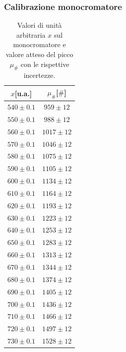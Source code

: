 \subsubsection{Calibrazione monocromatore}
\begin{table}[H]
    \centering
    \begin{tabular}{|c|c|}
        \hline
        
        \textbf{$x$[u.a.]} & \textbf{$\mu_{\#}$[$\#$]}  \\ \hline \hline
        $ 540 \pm 0.1 $  &  $ 959  \pm  12 $  \\ \hline        
        $ 550 \pm 0.1 $  &  $ 988  \pm  12 $  \\ \hline
        $ 560 \pm 0.1 $  &  $ 1017  \pm  12 $   \\ \hline
        $ 570 \pm 0.1 $  &  $ 1046  \pm  12 $  \\ \hline
        $ 580 \pm 0.1 $  &  $ 1075  \pm  12 $   \\ \hline
        $ 590 \pm 0.1 $  &  $ 1105  \pm  12 $  \\ \hline
        $ 600 \pm 0.1 $  &  $ 1134  \pm  12 $ \\ \hline
        $ 610 \pm 0.1 $  &  $ 1164  \pm  12 $  \\ \hline
        $ 620 \pm 0.1 $  &  $ 1193  \pm  12 $ \\ \hline
        $ 630 \pm 0.1 $  &  $ 1223  \pm  12 $  \\ \hline
        $ 640 \pm 0.1 $  &  $ 1253  \pm  12 $  \\ \hline        
        $ 650 \pm 0.1 $  &  $ 1283  \pm  12 $  \\ \hline
        $ 660 \pm 0.1 $  &  $ 1313  \pm  12 $   \\ \hline
        $ 670 \pm 0.1 $  &  $ 1344  \pm  12 $  \\ \hline
        $ 680 \pm 0.1 $  &  $ 1374  \pm  12 $   \\ \hline
        $ 690 \pm 0.1 $  &  $ 1405  \pm  12 $  \\ \hline
        $ 700 \pm 0.1 $  &  $ 1436  \pm  12 $ \\ \hline
        $ 710 \pm 0.1 $  &  $ 1466  \pm  12 $  \\ \hline
        $ 720 \pm 0.1 $  &  $ 1497  \pm  12 $ \\ \hline
        $ 730 \pm 0.1 $  &  $ 1528  \pm  12 $  \\ \hline
        
    \end{tabular}
    \caption{\footnotesize Valori di unità arbitraria $x$ sul monocromatore e valore atteso del picco $\mu_{\#}$ con le rispettive incertezze.}
    \label{tab:cal_monoc}    
\end{table}
\newpage
